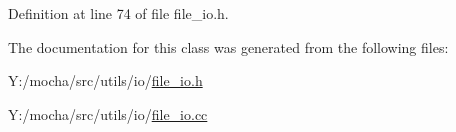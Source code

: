 Definition at line 74 of file file\_\-io.h.



The documentation for this class was generated from the following files:\begin{DoxyCompactItemize}
\item 
Y:/mocha/src/utils/io/\hyperlink{file__io_8h}{file\_\-io.h}\item 
Y:/mocha/src/utils/io/\hyperlink{file__io_8cc}{file\_\-io.cc}\end{DoxyCompactItemize}
